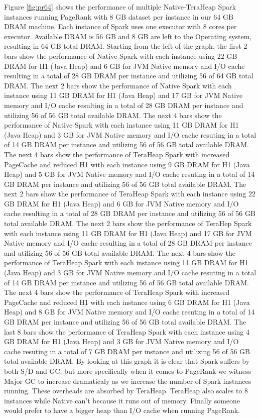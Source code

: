 Figure \ref{fig:pr64} shows the performance of multiple
Native-TeraHeap Spark instances running PageRank with 8 GB dataset per
instance in our 64 GB DRAM machine. Each instance of Spark uses one
executor with 8 cores per executor. Available DRAM is 56 GB and 8 GB
are left to the Operating system, resulting in 64 GB total DRAM.
Starting from the left of the graph, the first 2 bars show the
performance of Native Spark with each instance using 22 GB DRAM for H1
(Java Heap) and 6 GB for JVM Native memory and I/O cache resulting in
a total of 28 GB DRAM per instance and utilizing 56 of 64 GB total
DRAM. The next 2 bars show the performance of Native Spark with each
instance using 11 GB DRAM for H1 (Java Heap) and 17 GB for JVM Native
memory and I/O cache resulting in a total of 28 GB DRAM per instance
and utilizing 56 of 56 GB total available DRAM. The next 4 bars show
the performance of Native Spark with each instance using 11 GB DRAM
for H1 (Java Heap) and 3 GB for JVM Native memory and I/O cache
resuting in a total of 14 GB DRAM per instance and utilizing 56 of 56
GB total available DRAM. The next 4 bars show the performance of
TeraHeap Spark with increased PageCache and reduced H1 with each
instance using 9 GB DRAM for H1 (Java Heap) and 5 GB for JVM Native
memory and I/O cache resuting in a total of 14 GB DRAM per instance
and utilizing 56 of 56 GB total available DRAM. The next 2 bars show
the performance of TeraHeap Spark with each instance using 22 GB DRAM
for H1 (Java Heap) and 6 GB for JVM Native memory and I/O cache
resulting in a total of 28 GB DRAM per instance and utilizing 56 of 56
GB total available DRAM. The next 2 bars show the performance of
TeraHep Spark with each instance using 11 GB DRAM for H1 (Java Heap)
and 17 GB for JVM Native memory and I/O cache resulting in a total of
28 GB DRAM per instance and utilizing 56 of 56 GB total available
DRAM. The next 4 bars show the performance of TeraHeap Spark with each
instance using 11 GB DRAM for H1 (Java Heap) and 3 GB for JVM Native
memory and I/O cache resuting in a total of 14 GB DRAM per instance
and utilizing 56 of 56 GB total available DRAM. The next 4 bars show
the performance of TeraHeap Spark with increased PageCache and reduced
H1 with each instance using 6 GB DRAM for H1 (Java Heap) and 8 GB for
JVM Native memory and I/O cache resuting in a total of 14 GB DRAM per
instance and utilizing 56 of 56 GB total available DRAM. The last 8
bars show the performance of TeraHeap Spark with each instance using 4
GB DRAM for H1 (Java Heap) and 3 GB for JVM Native memory and I/O
cache resuting in a total of 7 GB DRAM per instance and utilizing 56
of 56 GB total available DRAM.  By looking at this graph it is clear
that Spark suffers by both S/D and GC, but more specifically when it
comes to PageRank we witness Major GC to increase dramaticaly as we
increase the number of Spark instances running. These overheads are
absorbed by TeraHeap. TeraHeap also scales to 8 instances while Native
can't because it runs out of memory. Finally someone would prefer to
have a bigger heap than I/O cache when running PageRank.

